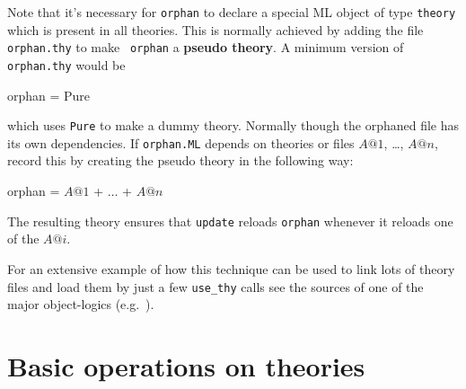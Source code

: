 Note that it's necessary for {\tt orphan} to declare a special ML
object of type {\tt theory} which is present in all theories. This is
normally achieved by adding the file {\tt orphan.thy} to make {\tt
orphan} a {\bf pseudo theory}. A minimum version of {\tt orphan.thy}
would be

\begin{ttbox}
orphan = Pure
\end{ttbox}

which uses {\tt Pure} to make a dummy theory. Normally though the
orphaned file has its own dependencies.  If {\tt orphan.ML} depends on
theories or files $A@1$, \ldots, $A@n$, record this by creating the
pseudo theory in the following way:
\begin{ttbox}
orphan = \(A@1\) + \(\ldots\) + \(A@n\)
\end{ttbox}
The resulting theory ensures that {\tt update} reloads {\tt orphan}
whenever it reloads one of the $A@i$.

For an extensive example of how this technique can be used to link
lots of theory files and load them by just a few {\tt use_thy} calls
see the sources of one of the major object-logics (e.g.\ \ZF).



\section{Basic operations on theories}\label{BasicOperationsOnTheories}
